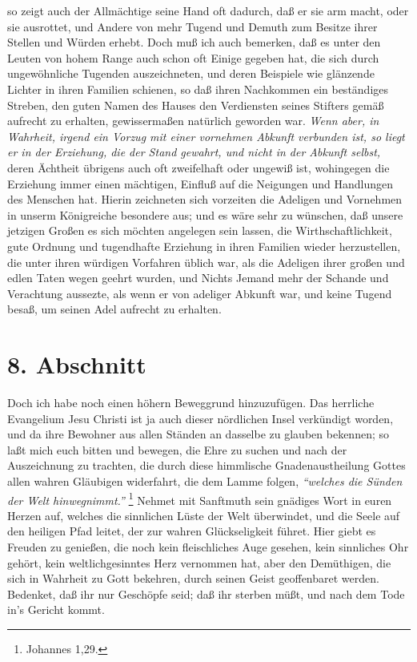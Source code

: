 so zeigt auch der Allmächtige seine Hand oft dadurch, daß
er sie arm macht, oder
sie ausrottet, und Andere von mehr Tugend und Demuth zum
Besitze ihrer Stellen
und Würden erhebt. Doch muß ich auch bemerken, daß es unter den Leuten von hohem
Range auch schon oft Einige gegeben hat, die sich durch ungewöhnliche Tugenden
auszeichneten, und deren Beispiele wie glänzende Lichter in ihren Familien
schienen, so daß ihren Nachkommen ein beständiges Streben, den guten Namen des
Hauses den Verdiensten seines Stifters gemäß aufrecht zu erhalten, gewissermaßen
natürlich geworden war. \textit{Wenn aber, in Wahrheit, irgend ein Vorzug mit
einer
vornehmen Abkunft verbunden ist, so liegt er in der Erziehung,
die der Stand
gewahrt, und nicht in der Abkunft selbst,} deren Ächtheit übrigens auch oft
zweifelhaft oder ungewiß ist, wohingegen die Erziehung immer einen mächtigen,
Einfluß auf die Neigungen und Handlungen des Menschen hat. Hierin zeichneten
sich vorzeiten die Adeligen und Vornehmen in unserm Königreiche besondere aus;
und es wäre sehr zu wünschen, daß unsere jetzigen Großen es sich möchten
angelegen sein lassen, die Wirthschaftlichkeit, gute Ordnung und tugendhafte
Erziehung in ihren Familien wieder herzustellen, die unter ihren würdigen
Vorfahren üblich war, als die Adeligen ihrer großen und edlen Taten wegen
geehrt wurden, und Nichts Jemand mehr der Schande und Verachtung aussezte, als
wenn er von adeliger Abkunft war, und keine Tugend besaß, um seinen Adel
aufrecht zu erhalten.

\section{8. Abschnitt} \label{kap11_ab8}

Doch ich habe noch einen höhern Beweggrund hinzuzufügen. Das herrliche
Evangelium Jesu Christi ist ja auch dieser nördlichen Insel verkündigt
worden, und da ihre Bewohner aus allen Ständen an dasselbe zu glauben bekennen;
so laßt mich euch bitten und bewegen, die Ehre zu suchen und nach der
Auszeichnung zu trachten, die durch diese himmlische
Gnadenaustheilung Gottes
allen wahren Gläubigen widerfahrt, die dem Lamme folgen,
\textit{"`welches die Sünden
der Welt hinwegnimmt."'}
\footnote{Johannes 1,29.}
Nehmet mit Sanftmuth sein gnädiges
Wort in euren Herzen auf, welches die sinnlichen Lüste der Welt
überwindet, und
die Seele auf den heiligen Pfad leitet, der zur wahren Glückseligkeit führet.
Hier giebt es Freuden zu genießen, die noch kein fleischliches Auge gesehen,
kein sinnliches Ohr gehört, kein weltlichgesinntes Herz vernommen hat, aber den
Demüthigen, die sich in Wahrheit zu Gott bekehren, durch seinen Geist
geoffenbaret werden. Bedenket, daß ihr nur Geschöpfe seid; daß ihr sterben müßt,
und nach dem Tode in’s Gericht kommt.

